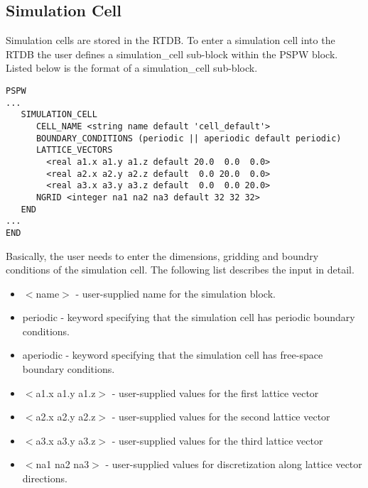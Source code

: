 \subsection{Simulation Cell}
\label{sec:pspw_cell}
Simulation cells are stored in the RTDB.  To enter a  simulation cell
into the RTDB the user defines a simulation\_cell sub-block within the PSPW 
block.  Listed below is the format of a simulation\_cell sub-block.
\begin{verbatim}
PSPW
...
   SIMULATION_CELL
      CELL_NAME <string name default 'cell_default'>
      BOUNDARY_CONDITIONS (periodic || aperiodic default periodic)
      LATTICE_VECTORS
        <real a1.x a1.y a1.z default 20.0  0.0  0.0>
        <real a2.x a2.y a2.z default  0.0 20.0  0.0>
        <real a3.x a3.y a3.z default  0.0  0.0 20.0>
      NGRID <integer na1 na2 na3 default 32 32 32>
   END
...
END
\end{verbatim}
Basically, the user needs to enter the dimensions, gridding and boundry
conditions of the simulation cell.  The following list describes the 
input in detail.
\begin{itemize}
        \item $<$name$>$ - user-supplied name for the simulation block.
        \item periodic - keyword specifying that the simulation cell 
                         has periodic boundary conditions.      
        \item aperiodic - keyword specifying that the simulation cell
                          has free-space boundary conditions. 
        \item $<$a1.x a1.y a1.z$>$ - user-supplied values for the first 
                                   lattice vector 
        \item $<$a2.x a2.y a2.z$>$ - user-supplied values for the second 
                                   lattice vector
        \item $<$a3.x a3.y a3.z$>$ - user-supplied values for the third 
                                   lattice vector
        \item $<$na1 na2 na3$>$ - user-supplied values for discretization 
                                along lattice vector directions.
\end{itemize}

